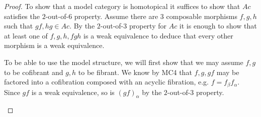 \documentclass[../thesis.tex]{subfiles}
\begin{document}
            \begin{proof}
                To show that a model category is homotopical it suffices to show that $Ac$ satisfies the $2$-out-of-$6$ property. Assume there are $3$ composable morphisms $f,g,h$ such that $gf,hg\in Ac$. By the $2$-out-of-$3$ property for $Ac$ it is enough to show that at least one of $f,g,h,fgh$ is a weak equivalence to deduce that every other morphism is a weak equivalence.
                \begin{center}
                \end{center}

                To be able to use the model structure, we will first show that we may assume $f,g$ to be cofibrant and $g,h$ to be fibrant. We know by MC4 that $f,g,gf$ may be factored into a cofibration composed with an acyclic fibration, e.g. $f = f_\beta f_\alpha$. Since $gf$ is a weak equivalence, so is $(gf)_\alpha$ by the $2$-out-of-$3$ property.
                \begin{center}
                \end{center}


\end{proof}
\end{document}
